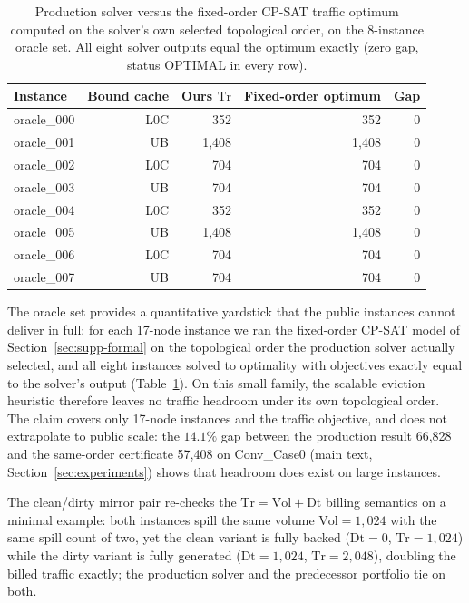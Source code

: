 \begin{table}[htbp]
\centering
\caption{Production solver versus the fixed-order CP-SAT traffic optimum
computed on the solver's own selected topological order, on the 8-instance
oracle set.  All eight solver outputs equal the optimum exactly (zero gap,
status OPTIMAL in every row).}
\label{tab:supp-synth-v2-oracle}
\begin{tabular}{lrrrr}
\toprule
Instance & Bound cache & Ours $\mathrm{Tr}$ & Fixed-order optimum & Gap\\
\midrule
oracle\_000 & L0C & 352 & 352 & 0\\
oracle\_001 & UB & 1,408 & 1,408 & 0\\
oracle\_002 & L0C & 704 & 704 & 0\\
oracle\_003 & UB & 704 & 704 & 0\\
oracle\_004 & L0C & 352 & 352 & 0\\
oracle\_005 & UB & 1,408 & 1,408 & 0\\
oracle\_006 & L0C & 704 & 704 & 0\\
oracle\_007 & UB & 704 & 704 & 0\\
\bottomrule
\end{tabular}
\end{table}

The oracle set provides a quantitative yardstick that the public instances
cannot deliver in full: for each 17-node instance we ran the fixed-order
CP-SAT model of Section~\ref{sec:supp-formal} on the topological order the
production solver actually selected, and all eight instances solved to
optimality with objectives exactly equal to the solver's output
(Table~\ref{tab:supp-synth-v2-oracle}).  On this small family, the scalable
eviction heuristic therefore leaves no traffic headroom under its own
topological order.  The claim covers only 17-node instances and the traffic
objective, and does not extrapolate to public scale: the $14.1\%$ gap between
the production result 66,828 and the same-order certificate 57,408 on
Conv\_Case0 (main text, Section~\ref{sec:experiments}) shows that headroom
does exist on large instances.

The clean/dirty mirror pair re-checks the
$\mathrm{Tr}=\mathrm{Vol}+\mathrm{Dt}$ billing semantics on a minimal example:
both instances spill the same volume $\mathrm{Vol}=1{,}024$ with the same
spill count of two, yet the clean variant is fully backed ($\mathrm{Dt}=0$,
$\mathrm{Tr}=1{,}024$) while the dirty variant is fully generated
($\mathrm{Dt}=1{,}024$, $\mathrm{Tr}=2{,}048$), doubling the billed traffic
exactly; the production solver and the predecessor portfolio tie on both.
